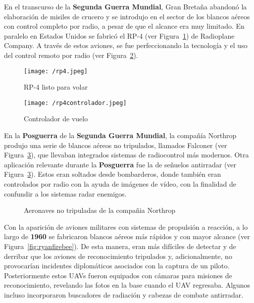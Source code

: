 En el transcurso de la \textbf{Segunda Guerra Mundial}, Gran Bretaña abandonó la elaboración de misiles de crucero y se introdujo en el sector de los blancos aéreos con control completo por radio, a pesar de que el alcance era muy limitado.
En paralelo en Estados Unidos se fabricó el RP-4 (ver Figura~\ref{fig:rp4}) de Radioplane Company. A través de estos aviones, se fue perfeccionando la tecnología y el uso del control remoto por radio (ver Figura~\ref{fig:controlador}).

\begin{figure}[!h]
\begin{center}
\texttt{[image: /rp4.jpeg]}
\caption[RP-4 listo para volar]{RP-4 listo para volar}
\label{fig:rp4}
\end{center}
\end{figure}


\begin{figure}[!h]
\begin{center}
\texttt{[image: /rp4controlador.jpeg]}
\caption[Controlador de vuelo]{Controlador de vuelo}
\label{fig:controlador}
\end{center}
\end{figure}

En la \textbf{Posguerra} de la \textbf{Segunda Guerra Mundial}, la compañía Northrop produjo una serie de blancos aéreos no tripulados, llamados Falconer (ver Figura~\ref{fig:northrop}), que llevaban integrados sistemas de radiocontrol más modernos. 
Otra aplicación relevante durante la \textbf{Posguerra} fue la de señuelos antirradar (ver Figura~\ref{fig:northrop}). Estos eran soltados desde bombarderos, donde también eran controlados por radio con la ayuda de imágenes de vídeo, con la finalidad de confundir a los sistemas radar enemigos.

\begin{figure}[!h]
\begin{center}
\caption[Aeronaves no tripuladas de la compañia Northrop]{Aeronaves no tripuladas de la compañia Northrop}
\label{fig:northrop}
\end{center}
\end{figure}

Con la aparición de aviones militares con sistemas de propulsión a reacción, a lo largo de \textbf{1960}
se fabricaron blancos aéreos más rápidos y con mayor alcance (ver Figura~\ref{fig:ryanfirebee}). De esta manera, eran más difíciles de detectar y de derribar que los aviones de reconocimiento tripulados y, adicionalmente, no provocarían incidentes diplomáticos asociados con la captura de un piloto. 
Posteriormente estos \acs{UAV}s fueron equipados con cámaras para misiones de reconocimiento, revelando las fotos en la base cuando el \acs{UAV} regresaba. Algunos incluso incorporaron buscadores de radiación y cabezas de combate antirradar.


